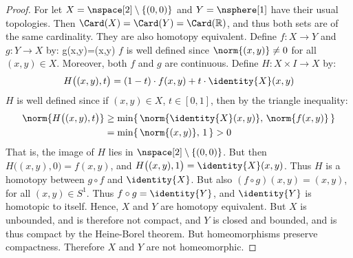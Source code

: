 \documentclass{book}                                                           %
\begin{document}
                \begin{proof}
                    For let $X=\nspace[2]\setminus\{(0,0)\}$ and
                    $Y=\nsphere[1]$ have their usual topologies. Then
                    $\Card(X)=\Card(Y)=\Card(\mathbb{R})$, and thus both sets
                    are of the same cardinality. They are also homotopy
                    equivalent. Define $f:X\rightarrow{Y}$ and
                    $g:Y\rightarrow{X}$ by:
                                {g(x,y)=(x,y)}
                    $f$ is well defined since $\norm{(x,y)}\ne{0}$ for all
                    $(x,y)\in{X}$. Moreover, both $f$ and $g$ are continuous.
                    Define $H:X\times{I}\rightarrow{X}$ by:
                    \begin{equation}
                        H\big((x,y),t\big)
                        =(1-t)\cdot{f}(x,y)+t\cdot\identity{X}(x,y)
                    \end{equation}
                    $H$ is well defined since if $(x,y)\in{X}$, $t\in[0,1]$,
                    then by the triangle inequality:
                    \begin{subequations}
                        \begin{align}
                            \norm{H\big((x,y),t\big)}
                            &\geq\min\{\,\norm{\identity{X}(x,y)},\,
                                \norm{f(x,y)}\,\}\\
                            &=\min\{\,\norm{(x,y)},\,1\,\}
                            >0
                        \end{align}
                    \end{subequations}
                    That is, the image of $H$ lies in
                    $\nspace[2]\setminus\{(0,0)\}$. But then
                    $H\big((x,y),0\big)=f(x,y)$, and
                    $H\big((x,y),1\big)=\identity{X}(x,y)$. Thus $H$ is a
                    homotopy between ${g}\circ{f}$ and $\identity{X}$. But also
                    $({f}\circ{g})(x,y)=(x,y)$, for all $(x,y)\in S^{1}$. Thus
                    ${f}\circ{g}=\identity{Y}$, and $\identity{Y}$ is homotopic
                    to itself. Hence, $X$ and $Y$ are homotopy equivalent. But
                    $X$ is unbounded, and is therefore not compact, and $Y$ is
                    closed and bounded, and is thus compact by the Heine-Borel
                    theorem. But homeomorphisms preserve compactness. Therefore
                    $X$ and $Y$ are not homeomorphic.
                \end{proof}
\end{document}
